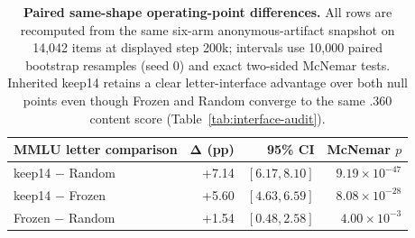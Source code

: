 \begin{table}[t]
\centering
\scriptsize
\setlength{\tabcolsep}{3.0pt}
\begin{tabular}{@{}lrrr@{}}
\toprule
\textbf{MMLU letter comparison} & $\boldsymbol{\Delta}$ \textbf{(pp)} &
\textbf{95\% CI} & \textbf{McNemar $p$} \\
\midrule
keep14 $-$ Random & +7.14 & $[6.17,8.10]$ & $9.19{\times}10^{-47}$ \\
keep14 $-$ Frozen & +5.60 & $[4.63,6.59]$ & $8.08{\times}10^{-28}$ \\
Frozen $-$ Random & +1.54 & $[0.48,2.58]$ & $4.00{\times}10^{-3}$ \\
\bottomrule
\end{tabular}
\caption{\textbf{Paired same-shape operating-point differences.} All rows are
recomputed from the same six-arm anonymous-artifact snapshot on 14,042 items
at displayed step 200k; intervals use 10,000 paired bootstrap resamples
(seed 0) and exact two-sided McNemar tests. Inherited keep14 retains
a clear letter-interface advantage over both null points even though Frozen and
Random converge to the same .360 content score
(Table~\ref{tab:interface-audit}).}
\label{tab:paired-operating-points}
\end{table}
